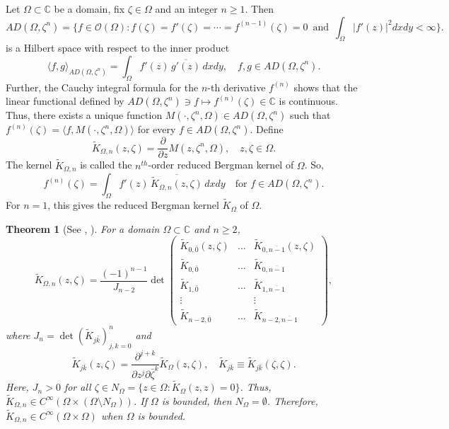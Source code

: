 \documentclass[11pt, reqno]{amsart}
\newtheorem{thm}{Theorem}[section]
\numberwithin{equation}{section}
\begin{document}
Let $\Omega\subset\mathbb{C}$ be a domain, fix $\zeta\in \Omega$ and an integer $n \ge 1$. Then
\[
AD(\Omega,\zeta^n)=\lbrace f\in \mathcal{O}(\Omega): f(\zeta)=f'(\zeta)=\cdots = f^{(n-1)}(\zeta)=0\,\text{ and }\,\int_{\Omega}\lvert f'(z)\rvert^2 dxdy <\infty\rbrace.
\]
is a Hilbert space with respect to the inner product
\[
\langle f,g\rangle_{AD(\Omega,\zeta^n)}=\int_{\Omega}f'(z)\,\overline{g'(z)}\,dx dy,\quad f,g\in AD(\Omega,\zeta^n).
\]
Further, the Cauchy integral formula for the $n$-th derivative $f^{(n)}$ shows that the linear functional defined by $AD(\Omega,\zeta^n)\ni f\mapsto f^{(n)}(\zeta)\in\mathbb{C}$ is continuous. Thus, there exists a unique function $M(\cdot,\zeta^n,\Omega)\in AD(\Omega,\zeta^n)$ such that
$f^{(n)}(\zeta)=\langle f, M(\cdot,\zeta^n,\Omega)\rangle$ for every $f\in AD(\Omega,\zeta^n)$. Define
\[
\tilde{K}_{\Omega,n}(z,\zeta)=\frac{\partial}{\partial z} M(z,\zeta^n,\Omega),\quad z,\zeta\in \Omega.
\]
The kernel $\tilde{K}_{\Omega,n}$ is called the $n^{th}$-order reduced Bergman kernel of $\Omega$. So,
\begin{equation}
f^{(n)}(\zeta)=\int_{\Omega} f'(z)\,\overline{\tilde{K}_{\Omega,n}(z,\zeta)}\,dxdy
\quad
\text{for } f\in AD(\Omega,\zeta^n).
\end{equation}
For $n=1$, this gives the reduced Bergman kernel $\tilde{K}_{\Omega}$ of $\Omega$.

\begin{thm} [See \cite{Bergman}, \cite{Burbea}]
For a domain $\Omega\subset\mathbb{C}$ and $n\geq 2$, 
\begin{equation}\label{det}
\tilde{K}_{\Omega,n}(z,\zeta)=
\frac{(-1)^{n-1}}{J_{n-2}}
\det\left(
\begin{matrix}
\tilde{K}_{0,\bar{0}}(z,\zeta)& \ldots & \tilde{K}_{0,\overline{n-1}}(z,\zeta)\\
\tilde{K}_{0,\bar{0}}& \ldots & \tilde{K}_{0,\overline{n-1}}\\
\tilde{K}_{1,\bar{0}}& \ldots & \tilde{K}_{1,\overline{n-1}}\\
\vdots & &\vdots\\
\tilde{K}_{n-2,\bar{0}}& \ldots & \tilde{K}_{n-2,\overline{n-1}}
\end{matrix}
\right),
\end{equation}
where $J_{n}=\det\left(\tilde{K}_{j\bar{k}}\right)_{j,k=0}^n$ and 
\[
\tilde{K}_{j\bar{k}}(z,\zeta)=\frac{\partial^{j+k}}{\partial z^j\partial\bar{\zeta}^k}\tilde{K}_{\Omega}(z,\zeta),\quad \tilde{K}_{j\bar{k}}\equiv \tilde{K}_{j\bar{k}}(\zeta,\zeta).
\]
Here, $J_n>0$ for all $\zeta\in N_{\Omega}=\{z\in \Omega: \tilde{K}_{\Omega}(z,z)=0\}$. Thus, $\tilde{K}_{\Omega,n}\in C^{\infty}(\Omega\times (\Omega\setminus N_{\Omega}))$. If $\Omega$ is bounded, then $N_{\Omega}=\emptyset$. Therefore, $\tilde{K}_{\Omega,n}\in C^{\infty}(\Omega\times \Omega)$ when $\Omega$ is bounded.
\end{thm}
\end{document}
